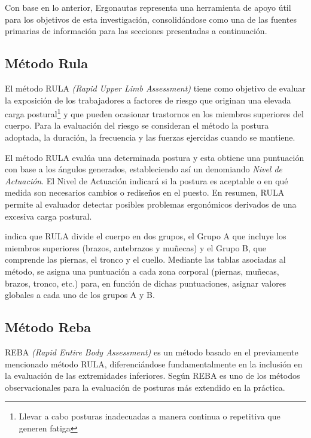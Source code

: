 Con base en lo anterior, Ergonautas representa una herramienta de apoyo útil para los objetivos de esta investigación, consolidándose como una de las fuentes primarias de información para las secciones presentadas a continuación.

\subsection{Método Rula}
El método RULA \textit{(Rapid Upper Limb Assessment)} tiene como objetivo de evaluar la exposición de los trabajadores a factores de riesgo que originan una elevada carga postural\footnote{Llevar a cabo posturas inadecuadas a manera continua o repetitiva que generen fatiga} y que pueden ocasionar trastornos en los miembros superiores del cuerpo. Para la evaluación del riesgo se consideran el método la postura adoptada, la duración, la frecuencia y las fuerzas ejercidas cuando se mantiene. \parencite[2]{Mcatamney1993RULA:Disorders}

El método RULA evalúa una determinada postura y esta obtiene una puntuación con base a los ángulos generados, estableciendo así un denomiando \textit{Nivel de Actuación}. El Nivel de Actuación indicará si la postura es aceptable o en qué medida son necesarios cambios o rediseños en el puesto. En resumen, RULA permite al evaluador detectar posibles problemas ergonómicos derivados de una excesiva carga postural. \parencite{Diego-Mas2015EvaluacionRULA} \parencite[4]{Mcatamney1993RULA:Disorders}

\parencite{Diego-Mas2015EvaluacionRULA} indica que RULA divide el cuerpo en dos grupos, el Grupo A que incluye los miembros superiores (brazos, antebrazos y muñecas) y el Grupo B, que comprende las piernas, el tronco y el cuello. Mediante las tablas asociadas al método, se asigna una puntuación a cada zona corporal (piernas, muñecas, brazos, tronco, etc.) para, en función de dichas puntuaciones, asignar valores globales a cada uno de los grupos A y B.
\subsection{Método Reba}
REBA \textit{(Rapid Entire Body Assessment)} es un método basado en el previamente mencionado método RULA, diferenciándose fundamentalmente en la inclusión en la evaluación de las extremidades inferiores. Según \parencite{Diego-Mas2015EvaluacionREBA} REBA es uno de los métodos observacionales para la evaluación de posturas más extendido en la práctica.

